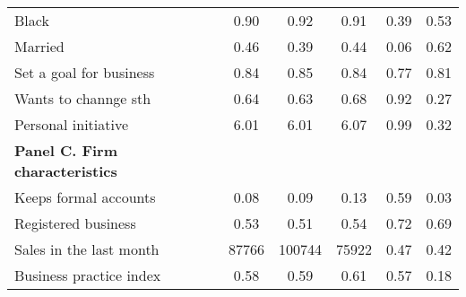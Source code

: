 \begin{table}
\begin{adjustbox}{width=\textwidth}
\begin{tabular}{lccccc}
Black                                                                                                 & 0.90              & 0.92                      & 0.91                   & 0.39                 & 0.53                  \\
Married                                                                                               & 0.46              & 0.39                      & 0.44                   & 0.06                 & 0.62                  \\
Set a goal for business                                                                               & 0.84              & 0.85                      & 0.84                   & 0.77                 & 0.81                  \\
Wants to channge sth                                                                                  & 0.64              & 0.63                      & 0.68                   & 0.92                 & 0.27                  \\
Personal initiative                                                                                   & 6.01              & 6.01                      & 6.07                   & 0.99                 & 0.32                  \\
\textbf{Panel C. Firm characteristics}                                                                &                   &                           &                        &                      &                       \\
Keeps formal accounts                                                                                 & 0.08              & 0.09                      & 0.13                   & 0.59                 & 0.03                  \\
Registered business                                                                                   & 0.53              & 0.51                      & 0.54                   & 0.72                 & 0.69                  \\
Sales in the last month                                                                               & 87766             & 100744                    & 75922                  & 0.47                 & 0.42                  \\
Business practice index                                                                               & 0.58              & 0.59                      & 0.61                   & 0.57                 & 0.18                  \\ 

\end{tabular}
\end{adjustbox}
\end{table}
